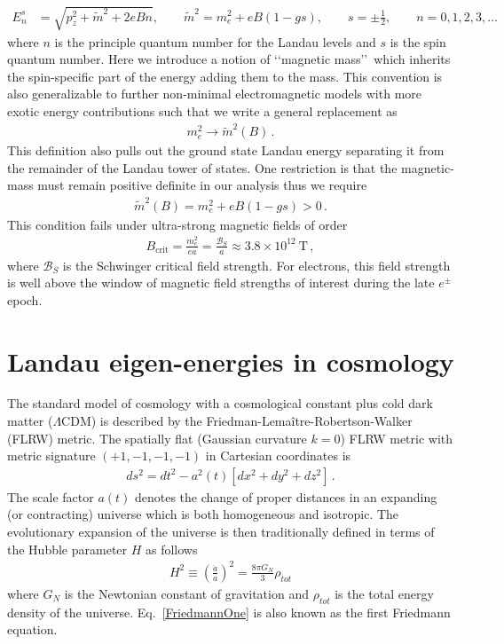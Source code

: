 \documentclass[Universe,article,submit,moreauthors,pdftex]{Definitions/mdpi}
\newcommand*{\req}[1]{Eq.~{\eqref{#1}}}
\begin{document}
\begin{align}
  \label{KGPEnergy} E_{n}^{s}&=\sqrt{p^2_z+\tilde{m}^2+2eBn},\qquad\tilde{m}^2=m^2_e+eB\left(1-gs\right),\qquad s=\pm\frac{1}{2},\qquad n=0,1,2,3,\dots
\end{align}
where $n$ is the principle quantum number for the Landau levels and $s$ is the spin quantum number. Here we introduce a notion of \lq\lq magnetic mass\rq\rq\ which inherits the spin-specific part of the energy adding them to the mass. This convention is also generalizable to further non-minimal electromagnetic models with more exotic energy contributions such that we write a general replacement as
\begin{align}
  \label{MagMass} m_{e}^{2}\rightarrow\tilde{m}^2(B)\,.
\end{align}
This definition also pulls out the ground state Landau energy separating it from the remainder of the Landau tower of states. One restriction is that the magnetic-mass must remain positive definite in our analysis thus we require
\begin{align}
  \label{MassLimit} \tilde{m}^2(B)=m^2_e+eB\left(1-gs\right)>0\,.
\end{align}
This condition fails under ultra-strong magnetic fields of order
\begin{align}
  \label{MagMassFail} B_{\mathrm{crit}}=\frac{m_{e}^{2}}{ea}=\frac{\mathcal{B}_{S}}{a}\approx3.8\times10^{12}\ \mathrm{T}\,,
\end{align}
where $\mathcal{B}_{S}$ is the Schwinger critical field strength. For electrons, this field strength is well above the window of magnetic field strengths of interest during the late $e^{\pm}$ epoch.

\section{Landau eigen-energies in cosmology}
\noindent The standard model of cosmology with a cosmological constant plus cold dark matter ($\Lambda\mathrm{CDM}$) is described by the Friedman-Lemaître-Robertson-Walker (FLRW) metric. The spatially flat (Gaussian curvature $k=0$) FLRW metric with metric signature $(+1,-1,-1,-1)$ in Cartesian coordinates is
\begin{align}
    \label{FLRW} ds^2=dt^2-a^2(t)\left[dx^2+dy^2+dz^2\right]\,.
\end{align}
The scale factor $a(t)$ denotes the change of proper distances in an expanding (or contracting) universe which is both homogeneous and isotropic. The evolutionary expansion of the universe is then traditionally defined in terms of the Hubble parameter $H$ as follows
\begin{align}
    \label{FriedmannOne}H^2\equiv\left(\frac{\dot a}{a}\right)^2=\frac{8\pi G_N}{3}\rho_{tot}
\end{align}
where $G_N$ is the Newtonian constant of gravitation and $\rho_{tot}$ is the total energy density of the universe. \req{FriedmannOne} is also known as the first Friedmann equation. 
\end{document}
